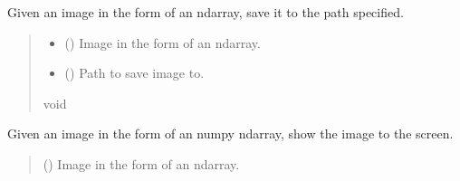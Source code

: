 \documentclass[letterpaper,10pt,english]{sphinxmanual}
\begin{document}
\begin{fulllineitems}
\begin{fulllineitems}
\begin{quote}
\begin{description}
\end{description}\end{quote}

\end{fulllineitems}


\begin{fulllineitems}
\label{\detokenize{comp_viz.utils:comp_viz.utils.toolbox.Tools.save_image}}
\pysigstartsignatures
{}
\pysigstopsignatures
\sphinxAtStartPar
Given an image in the form of an ndarray, save it to the path specified.
\begin{quote}\begin{description}
\begin{itemize}
\item {} 
\sphinxAtStartPar
{} () \textendash{} Image in the form of an ndarray.

\item {} 
\sphinxAtStartPar
{} () \textendash{} Path to save image to.

\end{itemize}

\sphinxAtStartPar
void

\end{description}\end{quote}

\end{fulllineitems}


\begin{fulllineitems}
\label{\detokenize{comp_viz.utils:comp_viz.utils.toolbox.Tools.show_image}}
\pysigstartsignatures
{}
\pysigstopsignatures
\sphinxAtStartPar
Given an image in the form of an numpy ndarray, show the image to the screen.
\begin{quote}\begin{description}
\sphinxAtStartPar
{} () \textendash{} Image in the form of an ndarray.


\end{description}
\end{quote}
\end{fulllineitems}
\end{fulllineitems}
\end{document}
